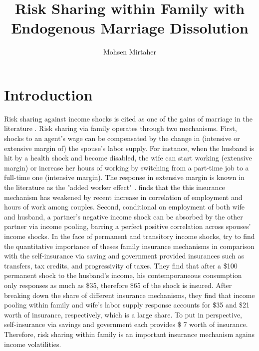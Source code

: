 





\title{Risk Sharing within Family with Endogenous Marriage Dissolution}
\author{Mohsen Mirtaher}
\date{}
\maketitle

\section{Introduction}



Risk sharing against income shocks is cited as one of the gains of marriage in the literature \citep{Chiappori_Mazzocco_2014}. Risk sharing via family operates through two mechanisms. First, shocks to an agent's wage can be compensated by the change in (intensive or extensive margin of) the spouse's labor supply. For instance, when the husband is hit by a health shock and become disabled, the wife can start working (extensive margin) or increase her hours of working by switching from a part-time job to a full-time one (intensive margin). The response in extensive margin is known in the literature as the "added worker effect" \citep{Hyslop_2001}. \citet{Juhn_Potter_2007} finds that the this insurance mechanism has weakened by recent increase in correlation of employment and hours of work among couples. Second, conditional on employment of both wife and husband,  a partner's negative income shock can be absorbed by the other partner via income pooling, barring a perfect positive correlation across spouses' income shocks. In the face of permanent and transitory income shocks, \citet{Blundell_etal_2015_Con-Ineq} try to find the quantitative importance of theses family insurance mechanisms in comparison with the self-insurance via saving and government provided insurances such as transfers, tax credits, and progressivity of taxes. They find that after a \$100 permanent shock to the husband's income, his contemporaneous consumption only responses as much as \$35, therefore \$65 of the shock is insured. After breaking down the share of different insurance mechanisms, they find that income pooling within family and wife's labor supply response accounts for \$35 and \$21 worth of insurance, respectively, which is a large share. To put in perspective, self-insurance via savings and government each provides \$ 7 worth of insurance. Therefore, risk sharing within family is an important insurance mechanism agains income volatilities.  \\

